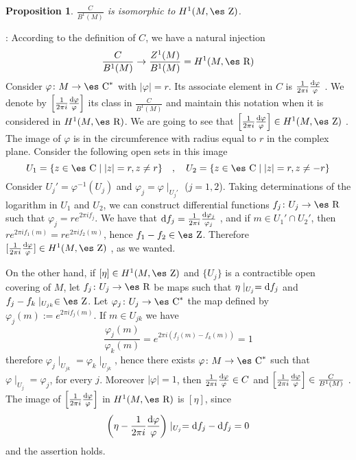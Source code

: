 \documentclass[12pt]{article}
\theoremstyle{plain}
\newtheorem{prop}{Proposition}
\def\dst{\(}
\def\qed{\ifvmode\removelastskip\fi
{\unskip\nobreak\hfil\penalty50\hbox{}\nobreak\hfil
\hbox{\vrule height1.2ex width1.2ex}\parfillskip=0pt
\finalhyphendemerits=0 \par\smallskip}}
\def\d{{\rm d}}
\def\Zahl{\mbox{\es Z}}
\def\Real{\mbox{\es R}}
\def\Complex{\mbox{\es C}}
\begin{document}
\begin{prop}
\dst\frac{C}{B^1(M)}\) is isomorphic to $H^1(M,\Zahl )$.
\end{prop}
: 
According to the definition of $C$, we have a natural injection
$$
\frac{C}{B^1(M)} \to \frac{Z^1(M)}{B^1(M)} = H^1(M,\Real )
$$
Consider $\varphi \colon M \to \Complex^*$ with $| \varphi | = r$.
Its associate element in $C$ is \dst\frac{1}{2\pi i}\frac{\d
\varphi}{\varphi}\) .
We denote by \dst\left[\frac{1}{2\pi i}\frac{\d
\varphi}{\varphi}\right]\)
its class in $\frac{C}{B^1(M)}$
and maintain this notation when it is considered in $H^1(M,\Real )$.
We are going to see that
\dst\left[\frac{1}{2\pi i}\frac{\d \varphi}{\varphi}\right] \in
H^1(M,\Zahl )\) .
The image of $\varphi$ is in the circumference
with radius equal to $r$ in the complex plane.
Consider the following open sets in this image
$$
U_1 = \{z \in \Complex \mid |z| = r , z \not= r \}
\quad , \quad
U_2 = \{z \in \Complex \mid |z| = r , z \not= -r \}
$$
Consider $U_j' =\varphi^{-1}(U_j)$
and
$\varphi_j = \varphi \mid_{U_j'}$ ($j=1,2$).
Taking determinations of the logarithm in $U_1$ and $U_2$,
we can construct differential functions $f_j \colon U_j \to \Real$
such that $\varphi _j = re^{2\pi i f_j}$.
We have that \dst\d f_j =\frac{1}{2\pi i}\frac{\d
\varphi_j}{\varphi_j}\) ,
and if $m \in U_1' \cap U_2'$, then
$re^{2\pi if_1(m)} = re^{2\pi if_2(m)}$, hence $f_1-f_2 \in \Zahl$.
Therefore \dst[\frac{1}{2\pi i}\frac{\d \varphi}{\varphi}] \in
H^1(M,\Zahl )\) ,
as we wanted.

On the other hand, if $[\eta ] \in H^1(M,\Zahl )$
and $\{ U_j \}$ is a contractible open covering of $M$,
let $f_j \colon U_j \to \Real$ be maps such that
$\eta \mid_{U_j} = \d f_j$ and $f_j-f_k \mid_{U_{jk}} \in \Zahl$.
Let $\varphi_j \colon U_j \to \Complex^*$
the map defined by $\varphi_j(m) := e^{2\pi if_j(m)}$.
If $m \in U_{jk}$ we have
$$
\frac{\varphi_j(m)}{\varphi_k(m)} = e^{2\pi i(f_j(m)-f_k(m))} = 1
$$
therefore $\varphi_j\mid_{U_{jk}} = \varphi_k\mid_{U_{jk}}$,
hence there exists $\varphi \colon M \to \Complex^*$
such that $\varphi \mid_{U_j} = \varphi_j$, for every $j$.
Moreover $|\varphi | = 1$, then
\dst\frac{1}{2\pi i}\frac{\d \varphi}{\varphi} \in C\) and
\dst\left[\frac{1}{2\pi i}\frac{\d \varphi}{\varphi}\right] \in
\frac{C}{B^1(M)}\) .
The image of
\dst\left[\frac{1}{2\pi i}\frac{\d \varphi}{\varphi}\right]\) in
$H^1(M,\Real )$
is $[\eta ]$, since
$$
\biggl( \eta - \frac{1}{2\pi i}\frac{\d \varphi}{\varphi} \biggr)
\mid_{U_j} = \d f_j - \d f_j = 0
$$
and the assertion holds.
\qed
\end{document}
